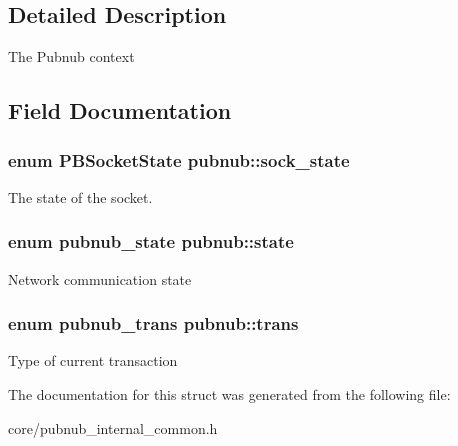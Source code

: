 \subsection{Detailed Description}
The Pubnub context 

\subsection{Field Documentation}
\hypertarget{structpubnub_abc73d01e757e4b049ebf04a1c298bf87}{
\subsubsection[{sock\-\_\-state}]{\setlength{\rightskip}{0pt plus 5cm}enum P\-B\-Socket\-State pubnub\-::sock\-\_\-state}}\label{structpubnub_abc73d01e757e4b049ebf04a1c298bf87}
The state of the socket. \hypertarget{structpubnub_aa17ba41d2fd001f647153b5ca7d3a437}{
\subsubsection[{state}]{\setlength{\rightskip}{0pt plus 5cm}enum pubnub\-\_\-state pubnub\-::state}}\label{structpubnub_aa17ba41d2fd001f647153b5ca7d3a437}
Network communication state \hypertarget{structpubnub_adf3f5c66118781bcfcb0f51782da3459}{
\subsubsection[{trans}]{\setlength{\rightskip}{0pt plus 5cm}enum pubnub\-\_\-trans pubnub\-::trans}}\label{structpubnub_adf3f5c66118781bcfcb0f51782da3459}
Type of current transaction 

The documentation for this struct was generated from the following file\-:\begin{DoxyCompactItemize}
\item 
core/pubnub\-\_\-internal\-\_\-common.\-h\end{DoxyCompactItemize}

